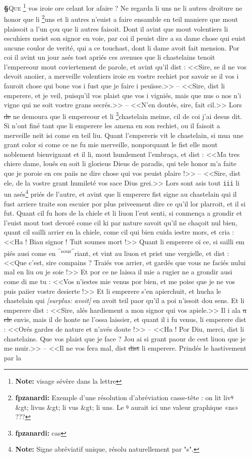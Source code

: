 \documentclass[12pt]{article} %
\newcommand{\colmar}[1]{\marginnote{[#1]}}          %
\newcommand{\num}[1]{\texttt{#1}}    %
\newcommand{\add}[1]{\textsuperscript{#1}}       %
\newcommand{\supplied}[1]{\textlangle#1\textrangle} %
\newcommand{\fnnote}[1]{\footnote{\textbf{Note:} #1}} %
\newcommand{\fnfpz}[1]{\footnote{\textbf{fpzanardi:} #1}} %
\newcommand{\del}[1]{\sout{#1}}      %
\newcommand{\surplus}[1]{\textit{[surplus: #1]}} %
\newcounter{paranum}
\newcommand{\pnum}{\stepcounter{paranum}\textbf{§\arabic{paranum}}\quad}
\begin{document}
\pnum \lettrine[lines=2]{\color{darkblue}Q}{ue} \fnnote{visage sévère dans la lettre} vos iroie ore celant lor afaire ? Ne regarda li uns ne li autres droiture ne honor que li \fnfpz{Exemple d’une résolution d’abréviation casse-tête : on lit livꝰ &gt; livus &gt; li vus &gt; li uns. Le ꝰ aurait ici une valeur graphique «ns» ???}uns et li autres n'euist a faire ensamble en teil maniere que mout plaissoit a l'un çou que li autres faisoit. Dont il avint que mout volentiers li escuhiers meist son signor en voie, par coi il peuist dire a sa dame chose qui euist aucune coulor de verité, qui a ce touchast, dont li dame avoit fait mension. Por coi il avint un jour asés tost apriés ces avenues que li chastelains tenoit l'empereour mout coviertement de parole, et avint qu'il dist : <<Sire, se il ne vos devoit anoiier, a merveille volentiers iroie en vostre rechiet por savoir se il vos i fauroit chose qui bone vos i fust que je faire i peuïsse.>> -- <<Sire, dist li emperere, et je veil, puisqu'il vos plaist que vos i vigniés, mais que nus o nos n'i vigne qui ne soit vostre g\supplied{ra}ns secrés.>> -- <<N'en doutés, sire, fait cil.>> Lors \del{de} ne demoura que li empereour et li \fnfpz{cas}chastelain meime, cil de coi j'ai desus dit. Si n'ont finé tant que li emperere les amena en son rechiet, ou il faisoit a merveille neït isi come en teil \colmar{11rb}\colmar{b} liu. Quant l'empereris vit le chastelain, si mua une grant color si come ce ne fu mie merveille, nonporquant le fist elle mout noblement bienvignant et il li, mout humlement l'embraça, et dist : <<Ma tres chiere dame, loués en soit li glorieus Dieus de paradis, qui tele honor m'a faite que je poroie en ces paiis ne dire chose qui vos peuist plaire !>> -- <<Sire, dist ele, de la vostre grant humileté vos sace Dius grei.>> Lors sont asis tout \num{iii} li un asés\fnnote{Signe abréviatif unique, résolu naturellement par "s".} priés de l'autre, et avint que li emperere fist signe au chastelain qui il fust arriere traite son escuier por plus priveement dire ce qu'il lor plarroit, et il si fut. Quant cil fu hors de la chiele et li liuon l'eut senti, si conmença a grondir et l'euist mout tost devoré come cil ki par nature savoit qu'il ne chaçoit nul bien, quant cil sailli arrier en la chiele, come cil qui bien cuida iestre mors, et cria : <<Ha ! Biau signor ! Tuit soumes mort !>> Quant li emperere oï ce, si sailli em piés ausi come en \add{^sour^}riant, et vint au liuon et prist une vergielle, et dist : <<Que c'est, sire compains ? Traiés vos arrier, et gardés que vous ne faciés nului mal en liu ou je soie !>> Et por ce ne laissa il mie a rugier ne a grondir ausi come di me tu : <<Vos n'iestes mie venus por bien, et me poise que je ne vos puis paiier vostre desierte !>> Et li emperere s'en apierchuit, et hucha le chastelain qui \surplus{avoit} en avoit teil paor qu'il a poi n'issoit dou sens. Et li emperere dist : <<Sire, alés hardiement a mon signor qui vos apiele.>> Il i ala \del{u ele} envis, mais il de honte ne l'ossa laissier, et quant il i fu venus, li emperere dist : <<Orés gardes de nature et n'avés doute !>> -- <<Ha ! Por Diu, merci, dist li chastelains. Que vos plaist que je face ? Jou ai si grant paour de cest liuon que je me muir.>> -- <<Il ne vos fera mal, dist \del{dist} li emperere. Prindés le hastivement par la 
\end{document}
